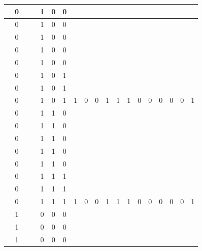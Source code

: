 \begin{table}[!tb]
\begin{tabular}{|c|c|c|c|c|c|c|c|c|c|c|c|c|c|c|c|c|c|c|}
        \rowcolor{red!40}  & 0 &  &  & 1 & 0 & 0 &  &  &  &  &  &  &  &  &  &  &  &  \\ \hline
        \rowcolor{red!40}  & 0 &  &  & 1 & 0 & 0 &  &  &  &  &  &  &  &  &  &  &  &  \\ \hline
        \rowcolor{red!40}  & 0 &  &  & 1 & 0 & 0 &  &  &  &  &  &  &  &  &  &  &  &  \\ \hline
        \rowcolor{red!40}  & 0 &  &  & 1 & 0 & 0 &  &  &  &  &  &  &  &  &  &  &  &  \\ \hline
        \rowcolor{red!40}  & 0 &  &  & 1 & 0 & 0 &  &  &  &  &  &  &  &  &  &  &  &  \\ \hline
        \rowcolor{red!40}  & 0 &  &  & 1 & 0 & 1 &  &  &  &  &  &  &  &  &  &  &  &  \\ \hline
        \rowcolor{red!40}  & 0 &  &  & 1 & 0 & 1 &  &  &  &  &  &  &  &  &  &  &  &  \\ \hline
        \rowcolor{red!40}  & 0 &  &  & 1 & 0 & 1 & 1 & 0 & 0 & 1 & 1 & 1 & 0 & 0 & 0 & 0 & 0 & 1 \\ \hline
        \rowcolor{green!40}  & 0 &  &  & 1 & 1 & 0 &  &  &  &  &  &  &  &  &  &  &  &  \\ \hline
        \rowcolor{green!40}  & 0 &  &  & 1 & 1 & 0 &  &  &  &  &  &  &  &  &  &  &  &  \\ \hline
        \rowcolor{green!40}  & 0 &  &  & 1 & 1 & 0 &  &  &  &  &  &  &  &  &  &  &  &  \\ \hline
        \rowcolor{green!40}  & 0 &  &  & 1 & 1 & 0 &  &  &  &  &  &  &  &  &  &  &  &  \\ \hline
        \rowcolor{green!40}  & 0 &  &  & 1 & 1 & 0 &  &  &  &  &  &  &  &  &  &  &  &  \\ \hline
        \rowcolor{green!40}  & 0 &  &  & 1 & 1 & 1 &  &  &  &  &  &  &  &  &  &  &  &  \\ \hline
        \rowcolor{green!40}  & 0 &  &  & 1 & 1 & 1 &  &  &  &  &  &  &  &  &  &  &  &  \\ \hline
        \rowcolor{green!40}  & 0 &  &  & 1 & 1 & 1 & 1 & 0 & 0 & 1 & 1 & 1 & 0 & 0 & 0 & 0 & 0 & 1 \\ \hline
        \rowcolor{yellow!40}  & 1 &  &  & 0 & 0 & 0 &  &  &  &  &  &  &  &  &  &  &  &  \\ \hline
        \rowcolor{yellow!40}  & 1 &  &  & 0 & 0 & 0 &  &  &  &  &  &  &  &  &  &  &  &  \\ \hline
        \rowcolor{yellow!40}  & 1 &  &  & 0 & 0 & 0 &  &  &  &  &  &  &  &  &  &  &  &  \\ \hline

\end{tabular}
\end{table}
